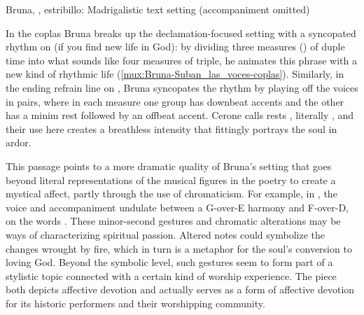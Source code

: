 
{Bruna, , estribillo: Madrigalistic text setting
(accompaniment omitted)}

In the coplas Bruna breaks up the declamation-focused setting with a syncopated
rhythm on  (if you find new life in God):
by dividing three measures () of duple time into what sounds like
four measures of triple, he animates this phrase with a new kind of rhythmic
life (\cref{mux:Bruna-Suban_las_voces-coplas}).
Similarly, in the ending refrain line on , Bruna syncopates the
rhythm by playing off the voices in pairs, where in each measure one group has
downbeat accents and the other has a minim rest followed by an offbeat accent.
Cerone calls rests , literally , and their use
here creates a breathless intensity that fittingly portrays the soul in ardor.%
    \citXXX[Cerone]

This passage points to a more dramatic quality of Bruna's setting that goes
beyond literal representations of the musical figures in the poetry to create a
mystical affect, partly through the use of chromaticism.
For example, in , the voice and accompaniment undulate between a
G-over-E\fl{} harmony and F\sh-over-D, on the words .
These minor-second gestures and chromatic alterations may be
ways of characterizing spiritual passion.
Altered notes could symbolize the changes wrought by fire, which in turn is a
metaphor for the soul's conversion to loving God.  
Beyond the symbolic level, such gestures seem to form part of a stylistic topic
connected with a certain kind of worship experience.  
The piece both depicts affective devotion and actually serves as a form of
affective devotion for its historic performers and their worshipping community.


\endinput

\section{%
Voices Rising in Intercession: 
\wtitle{Suban las voces al cielo} by Miguel Ambiela
}


The second villancico beginning \wtitle{Suban las voces al cielo}, by Miguel Ambiela, is based on the same poetic text set by Bruna, and probably on Bruna's music as well.
The new poem is dedicated to the Assumption of the Virgin Mary, and retains none of the fire or phoenix symbolism of Bruna's villancico.
The compositor of Ambiela's poetic text (likely Ambiela himself) has simply excerpted from the Bruna poem all the lines with musical vocabulary and built a new poem around them (\cref{poem:Suban-2-estribillo}).

